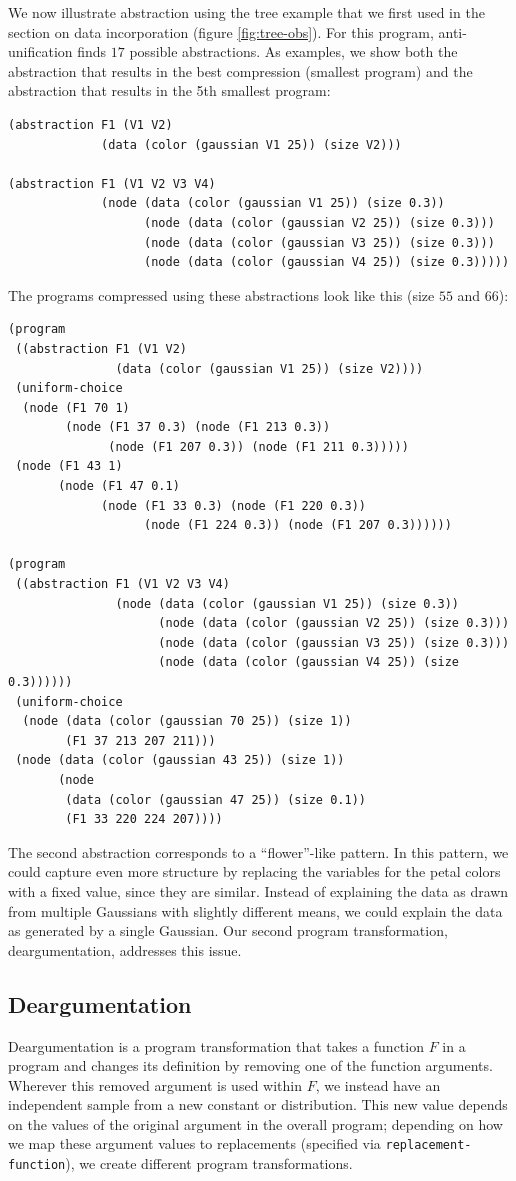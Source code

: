 \documentclass[a4paper,10pt]{article}
\begin{document}
We now illustrate abstraction using the tree example that we first used in the section on data incorporation (figure \ref{fig:tree-obs}).
For this program, anti-unification finds $17$ possible abstractions. As examples, we show both the abstraction that results in the best compression (smallest program) and the abstraction that results in the 5th smallest program:
\begin{lstlisting}
(abstraction F1 (V1 V2)
             (data (color (gaussian V1 25)) (size V2)))

(abstraction F1 (V1 V2 V3 V4)
             (node (data (color (gaussian V1 25)) (size 0.3))
                   (node (data (color (gaussian V2 25)) (size 0.3)))
                   (node (data (color (gaussian V3 25)) (size 0.3)))
                   (node (data (color (gaussian V4 25)) (size 0.3)))))
\end{lstlisting}
The programs compressed using these abstractions look like this (size $55$ and $66$):
\begin{lstlisting}
(program
 ((abstraction F1 (V1 V2)
               (data (color (gaussian V1 25)) (size V2))))
 (uniform-choice
  (node (F1 70 1)
        (node (F1 37 0.3) (node (F1 213 0.3))
              (node (F1 207 0.3)) (node (F1 211 0.3)))))
 (node (F1 43 1)
       (node (F1 47 0.1)
             (node (F1 33 0.3) (node (F1 220 0.3))
                   (node (F1 224 0.3)) (node (F1 207 0.3))))))

(program
 ((abstraction F1 (V1 V2 V3 V4)
               (node (data (color (gaussian V1 25)) (size 0.3))
                     (node (data (color (gaussian V2 25)) (size 0.3)))
                     (node (data (color (gaussian V3 25)) (size 0.3)))
                     (node (data (color (gaussian V4 25)) (size 0.3))))))
 (uniform-choice
  (node (data (color (gaussian 70 25)) (size 1))
        (F1 37 213 207 211)))
 (node (data (color (gaussian 43 25)) (size 1))
       (node
        (data (color (gaussian 47 25)) (size 0.1))
        (F1 33 220 224 207))))
\end{lstlisting}
The second abstraction corresponds to a ``flower''-like pattern. In this pattern, we could capture even more structure by replacing the variables for the petal colors with a fixed value, since they are similar. Instead of explaining the data as drawn from multiple Gaussians with slightly different means, we could explain the data as generated by a single Gaussian. Our second program transformation, deargumentation, addresses this issue.
\subsection{Deargumentation}
Deargumentation is a program transformation that takes a function $F$ in a program and changes its definition by removing one of the function arguments. Wherever this removed argument is used within $F$, we instead have an independent sample from a new constant or distribution. This new value depends on the values of the original argument in the overall program; depending on how we map these argument values to replacements (specified via \texttt{replacement-function}), we create different program transformations.
\end{document}
